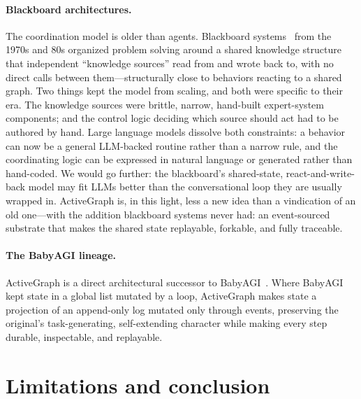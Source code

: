 \documentclass[11pt]{article}
\begin{document}
\paragraph{Blackboard architectures.}
The coordination model is older than agents. Blackboard systems~\cite{blackboard}
from the 1970s and 80s organized problem solving around a shared knowledge
structure that independent ``knowledge sources'' read from and wrote back to, with
no direct calls between them---structurally close to behaviors reacting to a shared
graph. Two things kept the model from scaling, and both were specific to their era.
The knowledge sources were brittle, narrow, hand-built expert-system components;
and the control logic deciding which source should act had to be authored by hand.
Large language models dissolve both constraints: a behavior can now be a general
LLM-backed routine rather than a narrow rule, and the coordinating logic can be
expressed in natural language or generated rather than hand-coded. We would go
further: the blackboard's shared-state, react-and-write-back model may fit LLMs
better than the conversational loop they are usually wrapped in. ActiveGraph is, in
this light, less a new idea than a vindication of an old one---with the addition
blackboard systems never had: an event-sourced substrate that makes the shared
state replayable, forkable, and fully traceable.

\paragraph{The BabyAGI lineage.}
ActiveGraph is a direct architectural successor to BabyAGI~\cite{babyagi}. Where
BabyAGI kept state in a global list mutated by a loop, ActiveGraph makes state a
projection of an append-only log mutated only through events, preserving the
original's task-generating, self-extending character while making every step
durable, inspectable, and replayable.

\section{Limitations and conclusion}
\label{sec:limitations}
\end{document}
